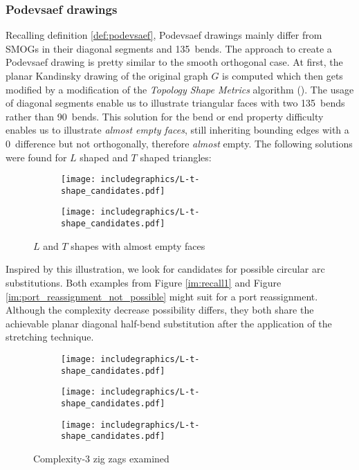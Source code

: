 \subsubsection{Podevsaef drawings}
Recalling definition \ref{def:podevsaef}, Podevsaef drawings mainly differ from SMOGs in their diagonal segments and 135\degree~bends. The approach to create a Podevsaef drawing is pretty similar to the smooth orthogonal case. At first, the planar Kandinsky drawing of the original graph $G$ is computed which then gets modified by a modification of the \textit{Topology Shape Metrics} algorithm (\cite[p. 4]{podevsaef}). The usage of diagonal segments enable us to illustrate triangular faces with two 135\degree~bends rather than 90\degree~bends. This solution for the bend or end property difficulty enables us to illustrate \textit{almost empty faces}, still inheriting bounding edges with a 0\degree~difference but not orthogonally, therefore \textit{almost} empty. The following solutions were found for $L$ shaped and $T$ shaped triangles:
\begin{figure}[H]
	\centering
	\begin{subfigure}{0.49\linewidth}
		\centering
		\texttt{[image: includegraphics/L-t-shape\_candidates.pdf]}
		\caption{}
	\end{subfigure}
	\begin{subfigure}{0.49\linewidth}
		\centering
		\texttt{[image: includegraphics/L-t-shape\_candidates.pdf]}
	\caption{}
\end{subfigure}
\caption{$L$ and $T$ shapes with almost empty faces}	
\end{figure}
Inspired by this illustration, we look for candidates for possible circular arc substitutions. Both examples from Figure \ref{im:recall1} and Figure \ref{im:port_reassignment_not_possible} might suit for a port reassignment. Although the complexity decrease possibility differs, they both share the achievable planar diagonal half-bend substitution after the application of the stretching technique.
\begin{figure}[H]
	\centering
	\begin{subfigure}{0.2\linewidth}
		\centering
		\texttt{[image: includegraphics/L-t-shape\_candidates.pdf]}
		\caption{}\label{im:zig-zag_candidates1}
	\end{subfigure}
	\begin{subfigure}{0.39\linewidth}
		\centering
		\texttt{[image: includegraphics/L-t-shape\_candidates.pdf]}
		\caption{}\label{im:zig-zag_candidates2}
	\end{subfigure}
	\begin{subfigure}{0.39\linewidth}
		\centering
		\texttt{[image: includegraphics/L-t-shape\_candidates.pdf]}
		\caption{}\label{im:zig-zag_candidates3}
	\end{subfigure}
	\caption{Complexity-3 zig zags examined}\label{im:zig-zag_candidates}	
\end{figure}
